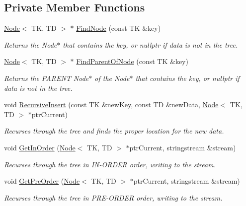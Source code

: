 \subsection*{Private Member Functions}
\begin{DoxyCompactItemize}
\item 
\hyperlink{classNode}{Node}$<$ TK, TD $>$ $\ast$ \hyperlink{classBinarySearchTree_a46d382c3d81f26edc48a683d98127b43}{Find\+Node} (const TK \&key)
\begin{DoxyCompactList}\small\item\em Returns the Node$\ast$ that contains the key, or nullptr if data is not in the tree. \end{DoxyCompactList}\item 
\hyperlink{classNode}{Node}$<$ TK, TD $>$ $\ast$ \hyperlink{classBinarySearchTree_a906da8772ab4d89b68f725a813de5706}{Find\+Parent\+Of\+Node} (const TK \&key)
\begin{DoxyCompactList}\small\item\em Returns the P\+A\+R\+E\+NT Node$\ast$ of the Node$\ast$ that contains the key, or nullptr if data is not in the tree. \end{DoxyCompactList}\item 
void \hyperlink{classBinarySearchTree_abc7ae8df7f28600e52fc18283ac74d4e}{Recursive\+Insert} (const TK \&new\+Key, const TD \&new\+Data, \hyperlink{classNode}{Node}$<$ TK, TD $>$ $\ast$ptr\+Current)
\begin{DoxyCompactList}\small\item\em Recurses through the tree and finds the proper location for the new data. \end{DoxyCompactList}\item 
void \hyperlink{classBinarySearchTree_ae32eaf601ac4c20a71c818f905e20e2e}{Get\+In\+Order} (\hyperlink{classNode}{Node}$<$ TK, TD $>$ $\ast$ptr\+Current, stringstream \&stream)
\begin{DoxyCompactList}\small\item\em Recurses through the tree in I\+N-\/\+O\+R\+D\+ER order, writing to the stream. \end{DoxyCompactList}\item 
void \hyperlink{classBinarySearchTree_ae67bb354708055152757d27d99d569bb}{Get\+Pre\+Order} (\hyperlink{classNode}{Node}$<$ TK, TD $>$ $\ast$ptr\+Current, stringstream \&stream)
\begin{DoxyCompactList}\small\item\em Recurses through the tree in P\+R\+E-\/\+O\+R\+D\+ER order, writing to the stream. \end{DoxyCompactList}\item 

\end{DoxyCompactItemize}

